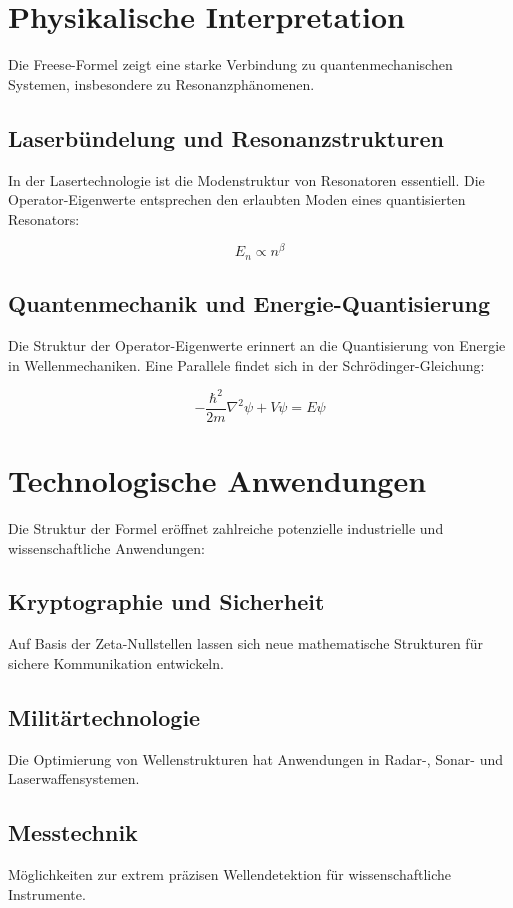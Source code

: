 \documentclass[a4paper,12pt]{article}
\begin{document}
\section{Physikalische Interpretation}
Die Freese-Formel zeigt eine starke Verbindung zu quantenmechanischen Systemen, insbesondere zu Resonanzphänomenen.

\subsection{Laserbündelung und Resonanzstrukturen}
In der Lasertechnologie ist die Modenstruktur von Resonatoren essentiell. Die Operator-Eigenwerte entsprechen den erlaubten Moden eines quantisierten Resonators:

\begin{equation}
E_n \propto n^\beta
\end{equation}

\subsection{Quantenmechanik und Energie-Quantisierung}
Die Struktur der Operator-Eigenwerte erinnert an die Quantisierung von Energie in Wellenmechaniken. Eine Parallele findet sich in der Schrödinger-Gleichung:

\begin{equation}
-\frac{\hbar^2}{2m} \nabla^2 \psi + V \psi = E \psi
\end{equation}

\section{Technologische Anwendungen}
Die Struktur der Formel eröffnet zahlreiche potenzielle industrielle und wissenschaftliche Anwendungen:

\subsection{Kryptographie und Sicherheit}
Auf Basis der Zeta-Nullstellen lassen sich neue mathematische Strukturen für sichere Kommunikation entwickeln.

\subsection{Militärtechnologie}
Die Optimierung von Wellenstrukturen hat Anwendungen in Radar-, Sonar- und Laserwaffensystemen.

\subsection{Messtechnik}
Möglichkeiten zur extrem präzisen Wellendetektion für wissenschaftliche Instrumente.
\end{document}
